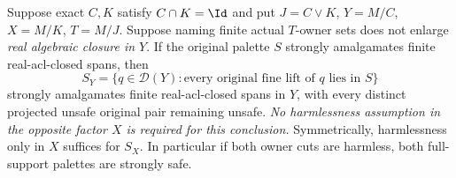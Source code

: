 \begin{lemma}
\label{lem:acf-quotient-safety}
Suppose exact $C,K$ satisfy $C\cap K=\Id$ and put
$J=C\vee K$, $Y=M/C$, $X=M/K$, $T=M/J$.
Suppose naming finite actual $T$-owner sets does not enlarge
\emph{real algebraic closure in $Y$}.  If the original palette
$S$ strongly amalgamates finite real-acl-closed spans, then
\[
 S_Y=\{q\in\mathcal D(Y):
       \text{every original fine lift of }q\text{ lies in }S\}
\]
strongly amalgamates finite real-acl-closed spans in $Y$,
with every distinct projected unsafe original pair remaining unsafe.
\emph{No harmlessness assumption in the opposite factor $X$ is
required for this conclusion.} Symmetrically, harmlessness only in
$X$ suffices for $S_X$. In particular if both owner cuts are
harmless, both full-support palettes are strongly safe.
\end{lemma}
